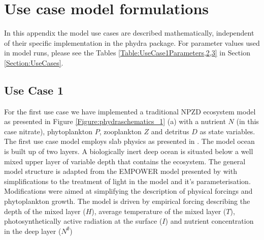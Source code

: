 \documentclass[template.tex]{subfiles}
\begin{document}
\section{Use case model formulations}

\begin{comment}
Note: to allow for an intuitive depiction of multiple instances of each parameter and state variable, modifying subscripts in symbols are instead added as a superscript (e.g. $\gamma^{N}$ for the nutrient-limitation of phytoplankton growth) so that indices in the subscript signify the dimensionality of symbols (e.g. $\gamma^{N}_i$ for the term per individual phytoplankton state variable $i$). This finds no usage in use case 1, but in both 2 and 3.
Overall I attempted to make the presentation of symbols and equations coherent between use cases.
\end{comment}

In this appendix the model use cases are described mathematically, independent of their specific implementation in the phydra package. For parameter values used in model runs, please see the Tables \ref{Table:UseCase1Parameters,2,3} in Section \ref{Section:UseCases}.

\subsection{Use Case 1}

For the first use case we have implemented a traditional NPZD ecosystem model as presented in Figure \ref{Figure:phydraschematics_1} (a) with a nutrient $N$ (in this case nitrate), phytoplankton $P$, zooplankton $Z$ and detritus $D$ as state variables. The first use case model employs slab physics as presented in \citet{Evans1985ACycles}. The model ocean is built up of two layers. A biologically inert deep ocean is situated below a well mixed upper layer of variable depth that contains the ecosystem. The general model structure is adapted from the EMPOWER model presented by \citet{Anderson2015c} with simplifications to the treatment of light in the model and it's parameterisation. 
Modifications were aimed at simplifying the description of physical forcings and phytoplankton growth. The model is driven by empirical forcing describing the depth of the mixed layer ($H$), average temperature of the mixed layer ($T$), photosynthetically active radiation at the surface ($I$) and nutrient concentration in the deep layer ($N^\emptyset$)

\\
\end{document}
